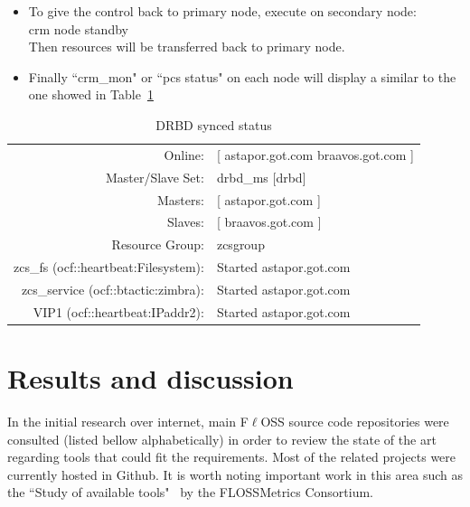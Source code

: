 \documentclass[a4paper, 12pt]{book}
\begin{document}
\begin{itemize}
	\item To give the control back to primary node, execute on secondary node:\\
			crm node standby\\
		  Then resources will be transferred back to primary node.
\end{itemize}


\begin{itemize}
	\item Finally ``crm\_mon" or ``pcs status" on each node will display a similar to the one showed in Table~\ref{table:sync}
\end{itemize}

\FloatBarrier
\begin{table}[H]
  \centering
  \begin{tabular}{ | r l | }
    \hline
      Online:                   & [ astapor.got.com braavos.got.com ]\\
      Master/Slave Set: 		& 	drbd\_ms [drbd]\\
      Masters: 					& [ astapor.got.com ]\\
      Slaves: 					& [ braavos.got.com ]\\
      Resource Group: 			& zcsgroup\\
      zcs\_fs (ocf::heartbeat:Filesystem): & Started astapor.got.com\\
      zcs\_service (ocf::btactic:zimbra):  & Started astapor.got.com\\
      VIP1 (ocf::heartbeat:IPaddr2):       & Started astapor.got.com\\
    \hline
  \end{tabular}
\caption{DRBD synced status}
\label{table:sync}
\end{table}


%
\chapter{Results and discussion}
\label{chap:results}

In the initial research over internet, main F$\ell$OSS source code repositories were consulted (listed bellow alphabetically) in order to review the state of the art regarding tools that could fit the requirements. Most of the related projects were currently hosted in Github. It is worth noting important work in this area such as the ``Study of available tools"~\cite{FMC} by the FLOSSMetrics Consortium.
\end{document}
